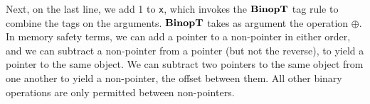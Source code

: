 \documentclass{llncs}
\begin{document}
  
\vspace{\abovedisplayskip}

Next, on the last line, we add 1 to {\tt x}, which invokes the \(\mathbf{BinopT}\) tag rule
to combine the tags on the arguments. \(\mathbf{BinopT}\) takes as argument the operation \(\oplus\).
In memory safety terms, we can add a pointer to a non-pointer in either order, and we can subtract
a non-pointer from a pointer (but not the reverse), to yield a pointer to the same object. We can
subtract two pointers to the same object from one another to yield a non-pointer, the offset between them.
All other binary operations are only permitted between non-pointers.
\end{document}
